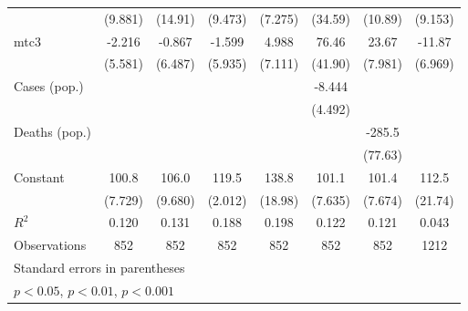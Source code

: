 \documentclass{article}
\begin{document}
{\begin{longtable}{l*{7}{c}}
                &  (9.881)         &  (14.91)         &  (9.473)         &  (7.275)         &  (34.59)         &  (10.89)         &  (9.153)         \\
mtc3            &   -2.216         &   -0.867         &   -1.599         &    4.988         &    76.46         &    23.67\sym{*}  &   -11.87         \\
                &  (5.581)         &  (6.487)         &  (5.935)         &  (7.111)         &  (41.90)         &  (7.981)         &  (6.969)         \\
Cases (pop.)    &                  &                  &                  &                  &   -8.444         &                  &                  \\
                &                  &                  &                  &                  &  (4.492)         &                  &                  \\
Deaths (pop.)   &                  &                  &                  &                  &                  &   -285.5\sym{*}  &                  \\
                &                  &                  &                  &                  &                  &  (77.63)         &                  \\
Constant        &    100.8\sym{***}&    106.0\sym{***}&    119.5\sym{***}&    138.8\sym{***}&    101.1\sym{***}&    101.4\sym{***}&    112.5\sym{**} \\
                &  (7.729)         &  (9.680)         &  (2.012)         &  (18.98)         &  (7.635)         &  (7.674)         &  (21.74)         \\
\hline
\(R^{2}\)       &    0.120         &    0.131         &    0.188         &    0.198         &    0.122         &    0.121         &    0.043         \\
Observations    &      852         &      852         &      852         &      852         &      852         &      852         &     1212         \\
\hline\hline
\multicolumn{8}{l}{\footnotesize Standard errors in parentheses}\\
\multicolumn{8}{l}{\footnotesize \sym{*} \(p<0.05\), \sym{**} \(p<0.01\), \sym{***} \(p<0.001\)}\\
\end{longtable}
}
\end{document}
